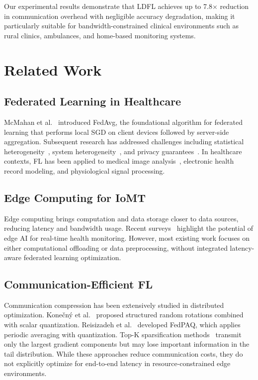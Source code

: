 \documentclass[10pt,conference]{IEEEtran}
\begin{document}
Our experimental results demonstrate that LDFL achieves up to 7.8$\times$ reduction in communication overhead with negligible accuracy degradation, making it particularly suitable for bandwidth-constrained clinical environments such as rural clinics, ambulances, and home-based monitoring systems.

\section{Related Work}
\label{sec:related_work}

\subsection{Federated Learning in Healthcare}
McMahan et al.~\cite{mcmahan2017communication} introduced FedAvg, the foundational algorithm for federated learning that performs local SGD on client devices followed by server-side aggregation. Subsequent research has addressed challenges including statistical heterogeneity~\cite{li2020federated}, system heterogeneity~\cite{li2020adaptive}, and privacy guarantees~\cite{geyer2017differentially}. In healthcare contexts, FL has been applied to medical image analysis~\cite{rajpurkar2022ai}, electronic health record modeling, and physiological signal processing.

\subsection{Edge Computing for IoMT}
Edge computing brings computation and data storage closer to data sources, reducing latency and bandwidth usage. Recent surveys~\cite{kairouz2021advances} highlight the potential of edge AI for real-time health monitoring. However, most existing work focuses on either computational offloading or data preprocessing, without integrated latency-aware federated learning optimization.

\subsection{Communication-Efficient FL}
Communication compression has been extensively studied in distributed optimization. Konečný et al.~\cite{konecny2016federated} proposed structured random rotations combined with scalar quantization. Reisizadeh et al.~\cite{reisizadeh2020fedpaq} developed FedPAQ, which applies periodic averaging with quantization. Top-K sparsification methods~\cite{stich2018sparsified,wangni2018atomo} transmit only the largest gradient components but may lose important information in the tail distribution. While these approaches reduce communication costs, they do not explicitly optimize for end-to-end latency in resource-constrained edge environments.
\end{document}
